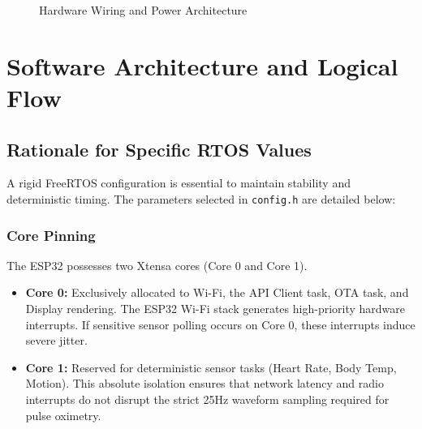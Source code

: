\documentclass[12pt,a4paper]{report}
\begin{document}
\begin{figure}[H]
{
    }
    \caption{Hardware Wiring and Power Architecture}
\end{figure}

\chapter{Software Architecture and Logical Flow}
\section{Rationale for Specific RTOS Values}
A rigid FreeRTOS configuration is essential to maintain stability and deterministic timing. The parameters selected in \texttt{config.h} are detailed below:

\subsection{Core Pinning}
The ESP32 possesses two Xtensa cores (Core 0 and Core 1).
\begin{itemize}
    \item \textbf{Core 0:} Exclusively allocated to Wi-Fi, the API Client task, OTA task, and Display rendering. The ESP32 Wi-Fi stack generates high-priority hardware interrupts. If sensitive sensor polling occurs on Core 0, these interrupts induce severe jitter.
    \item \textbf{Core 1:} Reserved for deterministic sensor tasks (Heart Rate, Body Temp, Motion). This absolute isolation ensures that network latency and radio interrupts do not disrupt the strict 25Hz waveform sampling required for pulse oximetry.
\end{itemize}
\end{document}
